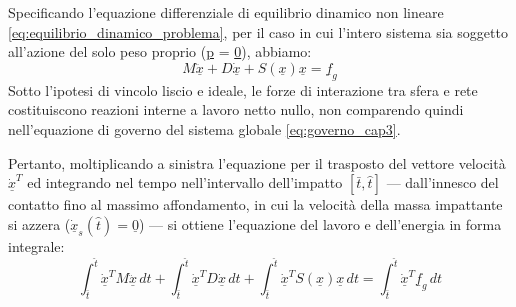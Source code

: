 Specificando l'equazione differenziale di equilibrio dinamico non lineare \eqref{eq:equilibrio_dinamico_problema}, per il caso in cui l'intero sistema sia soggetto all'azione del solo peso proprio (\underline{p} = \underline{0}), abbiamo:
\begin{equation}
  M \ddot{\underline{x}} + D \dot{\underline{x}} + S(\underline{x})\underline{x} = \underline{f}_g
  \label{eq:governo_cap3}
\end{equation}
Sotto l'ipotesi di vincolo liscio e ideale, le forze di interazione tra sfera e rete costituiscono reazioni interne a lavoro netto nullo, non comparendo quindi nell'equazione di governo del sistema globale \cref{eq:governo_cap3}. 

Pertanto, moltiplicando a sinistra l'equazione per il trasposto del vettore velocità $\dot{\underline{x}}^T$ ed integrando nel tempo nell'intervallo dell'impatto $[\bar{t}, \hat{t}]$ — dall'innesco del contatto fino al massimo affondamento, in cui la velocità della massa impattante si azzera ($\dot{\underline{x}}_{s}(\hat{t}) = \underline{0}$) — si ottiene l'equazione del lavoro e dell'energia in forma integrale:
\begin{equation}
    \int_{\bar{t}}^{\hat{t}} \underline{\dot{x}}^T M \ddot{\underline{x}} \, dt + \int_{\bar{t}}^{\hat{t}} \underline{\dot{x}}^T D \dot{\underline{x}} \, dt + \int_{\bar{t}}^{\hat{t}} \underline{\dot{x}}^T S(\underline{x}) \underline{x} \, dt = \int_{\bar{t}}^{\hat{t}} \underline{\dot{x}}^T \underline{f}_g \, dt
    \label{eq:bilancio_integrale}
\end{equation}

